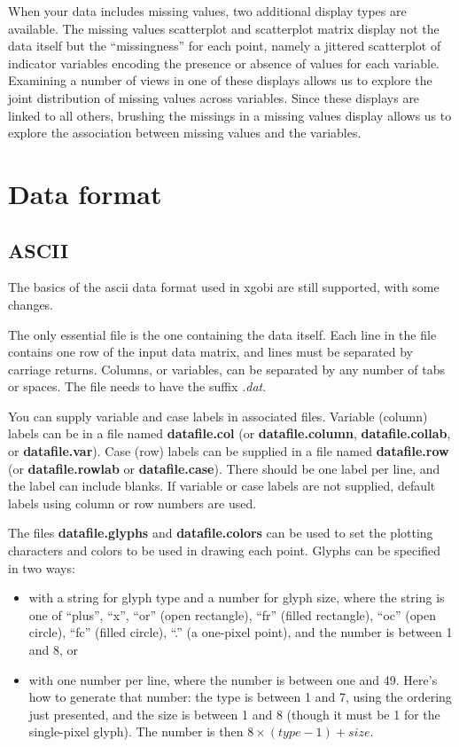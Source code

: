 \documentclass[11pt]{article}
\begin{document}
When your data includes missing values, two additional display types
are available.  The missing values scatterplot and scatterplot matrix
display not the data itself but the ``missingness'' for each point, namely
a jittered scatterplot of indicator variables encoding the presence or
absence of values for each variable.  Examining a number of views in one
of these displays allows us to explore the joint distribution of missing
values across variables.  Since these displays are linked to all others,
brushing the missings in a missing values display allows us to explore
the association between missing values and the variables.

\section{Data format}
\label{slbl:DataFormat}

\subsection {ASCII}
\label{slbl:ASCII}

The basics of the ascii data format used in xgobi are still supported, with
some changes.

The only essential file is the one containing the data itself.  Each
line in the file contains one row of the input data matrix, and lines
must be separated by carriage returns.  Columns, or variables, can be
separated by any number of tabs or spaces.  The file needs to have the
suffix {\em .dat}.

You can supply variable and case labels in associated files.
Variable (column) labels can be in a file named {\bf datafile.col}
(or {\bf datafile.column}, {\bf datafile.collab}, or {\bf
datafile.var}).  Case (row) labels can be supplied in a file named
{\bf datafile.row} (or {\bf data\-file.row\-lab} or {\bf
data\-file.case}).  There should be one label per line, and the label
can include blanks.  If variable or case labels are not supplied,
default labels using column or row numbers are used.

The files {\bf datafile.glyphs} and {\bf datafile.colors} can be
used to set the plotting characters and colors to be used in
drawing each point.  Glyphs can be specified in two ways:

\begin{itemize}
\item with a string for glyph type and a number for glyph size, where
the string is one of ``plus'', ``x'', ``or'' (open rectangle), ``fr''
(filled rectangle), ``oc'' (open circle), ``fc'' (filled circle),
``.'' (a one-pixel point), and the number is between 1 and 8, or
\item with one number per line, where the number is between one and
49.  Here's how to generate that number: the type is between 1 and 7,
using the ordering just presented, and the size is between 1 and 8
(though it must be 1 for the single-pixel glyph).  The number is then
$8 \times (type-1) + size$.
\end{itemize}
\end{document}

